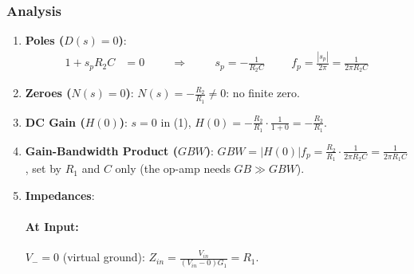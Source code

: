 \subsubsection{Analysis}
\begin{enumerate}
  \item \textbf{Poles (\(D(s) = 0\))}:
    \begin{align*}
      1 + s_p R_2 C &= 0 \hspace{1cm} \Rightarrow \hspace{1cm} s_p = -\frac{1}{R_2 C} \hspace{1cm} f_p = \frac{|s_p|}{2\pi} = \frac{1}{2\pi R_2 C}
    \end{align*}
  \item \textbf{Zeroes (\(N(s) = 0\))}: \(N(s) = -\frac{R_2}{R_1} \neq 0\): no finite zero.
  \item \textbf{DC Gain (\(H(0)\))}: \(s = 0\) in (1), \(H(0) = -\frac{R_2}{R_1}\cdot\frac{1}{1 + 0} = -\frac{R_2}{R_1}\).
  \item \textbf{Gain-Bandwidth Product (\(GBW\))}:
    \(GBW = |H(0)| f_p = \frac{R_2}{R_1}\cdot\frac{1}{2\pi R_2 C} = \frac{1}{2\pi R_1 C}\), set by \(R_1\) and \(C\)
    only (the op-amp needs \(GB \gg GBW\)).
  \item \textbf{Impedances}:
    \paragraph{At Input:} \(V_- = 0\) (virtual ground):
    \(Z_{in} = \frac{V_{in}}{(V_{in} - 0) G_1} = R_1\).

\end{enumerate}
